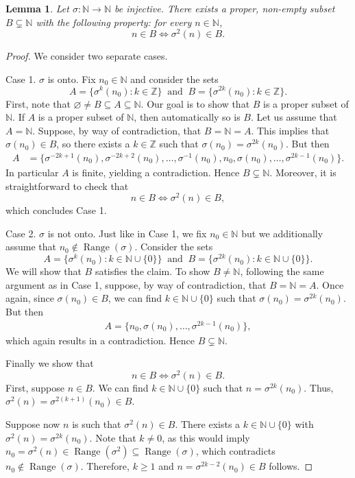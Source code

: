 \documentclass[a4paper,12pt]{article}
\newtheorem{lemma}[thm]{Lemma}
\theoremstyle{definition}
\numberwithin{equation}{section}
\numberwithin{thm}{section}
\newcommand{\N}{\mathbb{N}}
\newcommand{\Z}{\mathbb{Z}}
\begin{document}
\begin{lemma}
\label{sigmaset}
Let $\sigma:\N \rightarrow \N$ be injective. There exists a proper, non-empty subset $B \subsetneq \N$ with the following property: for every $n\in \N$,
$$n \in B \iff \sigma^2(n)\in B.$$ 
\end{lemma}
\begin{proof}
We consider two separate cases.

Case 1. $\sigma$ is onto. Fix $n_0 \in \N$ and consider the sets
$$A = \{\sigma^k(n_0): k\in \Z\} ~\text{ and } ~B = \{\sigma^{2k}(n_0): k \in \Z\}.$$
First, note that $\varnothing \neq B \subseteq A \subseteq \N$. Our goal is to show that $B$ is a proper subset of $\N$. If $A$ is a proper subset of $\N$, then automatically so is $B$. Let us assume that $A=\N$. Suppose, by way of contradiction, that $B=\N=A$. This implies that $\sigma(n_0) \in B$, so there exists a $k\in \Z$ such that $\sigma(n_0) = \sigma^{2k}(n_0)$. But then
\begin{align*}
A &= \{\sigma^{-2k+1}(n_0),\sigma^{-2k+2}(n_0),\dots,\sigma^{-1}(n_0),n_0, \sigma(n_0),\dots,\sigma^{2k-1}(n_0)\}. 
\end{align*}
In particular $A$ is finite, yielding a contradiction. Hence $B\subsetneq\N$. Moreover, it is straightforward to check that 
$$n \in B \iff \sigma^2(n)\in B,$$
which concludes Case 1.

Case 2. $\sigma$ is not onto. Just like in Case 1, we fix $n_0 \in \N$ but we additionally assume that $n_0\notin \operatorname{Range} (\sigma)$. Consider the sets 
$$A = \{\sigma^k(n_0): k\in \N\cup\{0\}\} ~\text{ and } ~B = \{\sigma^{2k}(n_0): k \in \N\cup \{0\}\}.$$
We will show that $B$ satisfies the claim. To show $B\neq \N$, following the same argument as in Case 1, suppose, by way of contradiction, that $B=\N=A$. Once again, since $\sigma(n_0) \in B$, we can find $k\in \N\cup \{0\}$ such that $\sigma(n_0) = \sigma^{2k}(n_0)$. But then
\begin{align*}
A =\{n_0,\sigma(n_0),\dots,\sigma^{2k-1}(n_0)\},
\end{align*}
which again results in a contradiction. Hence $B\subsetneq\N$. 

Finally we show that
$$n \in B \iff \sigma^2(n)\in B.$$ 
First, suppose $n\in B$. We can find $k\in \N\cup\{0\}$ such that
$n=\sigma^{2k}(n_0)$. Thus, $\sigma^2(n)=\sigma^{2(k+1)}(n_0) \in B$. 

Suppose now $n$ is such that $\sigma^2(n) \in B$. There exists a $k \in \N\cup\{0\}$ with $\sigma^2(n)=\sigma^{2k}(n_0)$. Note that $k\neq 0$, as this would imply $n_0=\sigma^2(n)\in \operatorname{Range}(\sigma^2) \subseteq \operatorname{Range}( \sigma)$, which contradicts $n_0 \notin \operatorname{Range}(\sigma)$. Therefore, $k\geq 1$ and $n=\sigma^{2k-2}(n_0) \in B$ follows.
\end{proof}
\end{document}
